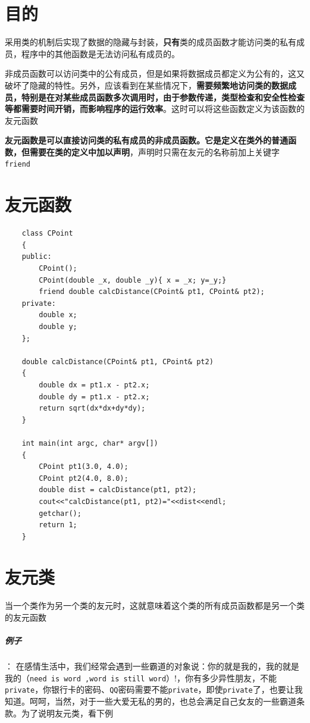 \documentclass[UTF8,a4paper,12pt]{ctexbook} %
\begin{document}
\section{目的}
		    采用类的机制后实现了数据的隐藏与封装，\textbf{只有}类的成员函数才能访问类的私有成员，程序中的其他函数是无法访问私有成员的。
	        
	        非成员函数可以访问类中的公有成员，但是如果将数据成员都定义为公有的，这又破坏了隐藏的特性。另外，应该看到在某些情况下，\textbf{需要频繁地访问类的数据成员，特别是在对某些成员函数多次调用时，由于参数传递，类型检查和安全性检查等都需要时间开销，而影响程序的运行效率}。这时可以将这些函数定义为该函数的友元函数
        
		    \textbf{友元函数是可以直接访问类的私有成员的非成员函数。它是定义在类外的普通函数，但需要在类的定义中加以声明}，声明时只需在友元的名称前加上关键字\verb|friend|
		    
\section{友元函数}
		    \begin{lstlisting}
	class CPoint
	{
	public:
		CPoint();
		CPoint(double _x, double _y){ x = _x; y=_y;}
		friend double calcDistance(CPoint& pt1, CPoint& pt2);
	private:
		double x;
		double y;
	};
	
	double calcDistance(CPoint& pt1, CPoint& pt2)
	{
		double dx = pt1.x - pt2.x;
		double dy = pt1.x - pt2.x;
		return sqrt(dx*dx+dy*dy);
	}
	
	int main(int argc, char* argv[])
	{
		CPoint pt1(3.0, 4.0);
		CPoint pt2(4.0, 8.0);
		double dist = calcDistance(pt1, pt2);
		cout<<"calcDistance(pt1, pt2)="<<dist<<endl;
		getchar();
		return 1;
	}		    
		    \end{lstlisting}
		    
\section{友元类}
			    当一个类作为另一个类的友元时，这就意味着这个类的所有成员函数都是另一个类的友元函数
		    
		    \subparagraph{例子}：
			    在感情生活中，我们经常会遇到一些霸道的对象说：你的就是我的，我的就是我的（\verb|need is word ,word is still word|）!，你有多少异性朋友，不能\verb|private|，你银行卡的密码、\verb|QQ|密码需要不能\verb|private|，即使\verb|private|了，也要让我知道。呵呵，当然，对于一些大爱无私的男的，也总会满足自己女友的一些霸道条款。为了说明友元类，看下例
		    
\end{document}
